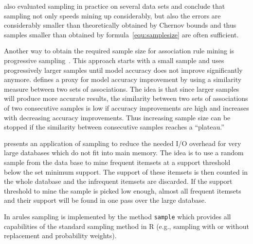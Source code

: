 \documentclass[10pt,a4paper]{article}
\newcommand{\strong}[1]{{\normalfont\fontseries{b}\selectfont #1}}
\newcommand{\code}[1]{\texttt{#1}}
\newcommand{\pkg}[1]{\strong{#1}}
\newcommand{\proglang}[1]{\textsf{#1}}
\begin{document}
\cite{arules:Zaki+Parthasarathy+Li+Ogihara:1997} 
also evaluated 
sampling in practice on several data sets and conclude that 
sampling not only speeds mining up considerably, but also
the errors are considerably smaller than theoretically obtained by 
Chernov bounds and thus samples smaller than obtained by
formula~\ref{equ:samplesize} are often sufficient.

Another way to obtain the required sample size 
for association rule mining is progressive 
sampling~\citep{arules:Parthasarathy:2002}.
This approach starts with a small sample and uses progressively larger 
samples until model accuracy does not improve significantly anymore. 
\cite{arules:Parthasarathy:2002} defines a proxy for 
model accuracy improvement by using a similarity measure between two
sets of associations. The idea is that 
since larger samples will produce more accurate results, the
similarity between two sets of associations of two consecutive samples
is low if accuracy improvements are high and increases with
decreasing accuracy improvements.
Thus increasing sample size can be stopped if the similarity
between consecutive samples reaches a ``plateau.'' 

\cite{arules:Toivonen:1996} presents an application of sampling to reduce
the needed I/O overhead for very large databases which do not fit into 
main memory.
The idea is to use a random sample from the data base to mine
frequent itemsets at a support threshold below the set minimum support.
The support of these itemsets is then counted in the whole database 
and the infrequent itemsets are discarded. 
If the support threshold to mine the sample is picked low enough, 
almost all frequent itemsets and their support will be found
in one pass over the large database.

In \pkg{arules} sampling is implemented by the method \code{sample}
which provides all capabilities of the standard sampling method in \proglang{R}
(e.g., sampling with or without replacement and probability weights).


\end{document}
